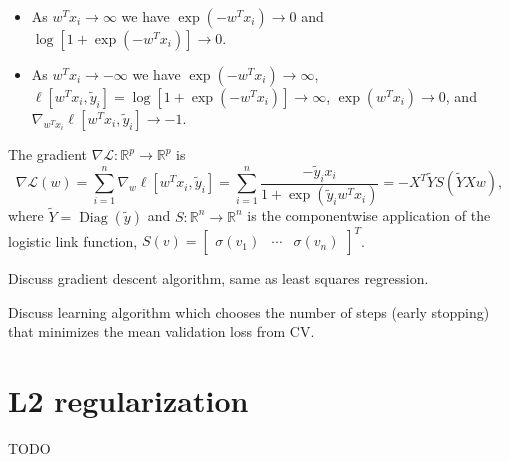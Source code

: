\documentclass{article}
\DeclareMathOperator*{\Diag}{Diag}
\begin{document}
\begin{itemize}
\item As $w^T x_i\rightarrow \infty$ we have
  $\exp(-w^T x_i)\rightarrow 0$ and
  $\log [1+\exp(- w^T x_i)]\rightarrow 0$.
\item As $w^T x_i\rightarrow -\infty$ we have
  $\exp(-w^T x_i)\rightarrow \infty$,
  $\ell[w^T x_i, \tilde y_i] = \log [1+\exp(- w^T x_i)]\rightarrow \infty$,
  $\exp(w^T x_i)\rightarrow 0$, and $\nabla_{w^T x_i} \ell[w^T x_i, \tilde y_i] \rightarrow -1$.
\end{itemize}


The gradient $\nabla\mathcal L:\mathbb R^p\rightarrow\mathbb R^p$ is
\begin{equation*}
\nabla \mathcal L(w) = \sum_{i=1}^n \nabla_w \ell[w^T x_i, \tilde y_i] = 
\sum_{i=1}^n \frac{
  -\tilde y_i x_i
}{
  1+\exp(\tilde y_i w^T x_i)
} = -X^T \tilde Y S(\tilde Y X w),
\end{equation*}
where $\tilde Y=\Diag(\tilde y)$ and $S:\mathbb R^n\rightarrow \mathbb R^n$ is the componentwise application
of the logistic link function,
$S(v) = \left[
    \begin{array}{ccc}
      \sigma(v_1) & \cdots & \sigma(v_n)
    \end{array}
\right]^T$.

Discuss gradient descent algorithm, same as least squares regression.

Discuss learning algorithm which chooses the number of steps (early
stopping) that minimizes the mean validation loss from CV.

\section{L2 regularization}

TODO
\end{document}
